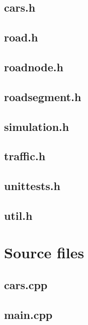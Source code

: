 \documentclass{article}
\begin{document}
  \subsection{cars.h}
    
  \subsection{road.h}
    
  \subsection{roadnode.h}
    
  \subsection{roadsegment.h}
    
  \subsection{simulation.h}
    
  \subsection{traffic.h}
    
  \subsection{unittests.h}
    
  \subsection{util.h}
    
\section{Source files}
  \subsection{cars.cpp}
    
  \subsection{main.cpp}
    
\end{document}
